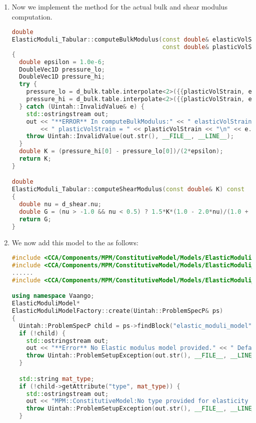 \begin{enumerate}
  \item Now we implement the method for the actual bulk and shear modulus computation.
\begin{lstlisting}[language=Cpp]
double
ElasticModuli_Tabular::computeBulkModulus(const double& elasticVolStrain,
                                          const double& plasticVolStrain) const
{
  double epsilon = 1.0e-6;
  DoubleVec1D pressure_lo;
  DoubleVec1D pressure_hi;
  try {
    pressure_lo = d_bulk.table.interpolate<2>({{plasticVolStrain, elasticVolStrain-epsilon}});
    pressure_hi = d_bulk.table.interpolate<2>({{plasticVolStrain, elasticVolStrain+epsilon}});
  } catch (Uintah::InvalidValue& e) {
    std::ostringstream out;
    out << "**ERROR** In computeBulkModulus:" << " elasticVolStrain = " << elasticVolStrain
        << " plasticVolStrain = " << plasticVolStrain << "\n" << e.message();
    throw Uintah::InvalidValue(out.str(), __FILE__, __LINE__);
  }
  double K = (pressure_hi[0] - pressure_lo[0])/(2*epsilon);
  return K;
}

double
ElasticModuli_Tabular::computeShearModulus(const double& K) const
{
  double nu = d_shear.nu;
  double G = (nu > -1.0 && nu < 0.5) ? 1.5*K*(1.0 - 2.0*nu)/(1.0 + nu) : d_shear.G0;
  return G;
}
\end{lstlisting}

  \item We now add this model to the  as follows:
\begin{lstlisting}[language=Cpp]
#include <CCA/Components/MPM/ConstitutiveModel/Models/ElasticModuliModelFactory.h>
#include <CCA/Components/MPM/ConstitutiveModel/Models/ElasticModuli_Arena.h>
......
#include <CCA/Components/MPM/ConstitutiveModel/Models/ElasticModuli_Tabular.h>

using namespace Vaango;
ElasticModuliModel*
ElasticModuliModelFactory::create(Uintah::ProblemSpecP& ps)
{
  Uintah::ProblemSpecP child = ps->findBlock("elastic_moduli_model");
  if (!child) {
    std::ostringstream out;
    out << "**Error** No Elastic modulus model provided." << " Default (constant elasticity) model needs at least two input parameters." << std::endl;
    throw Uintah::ProblemSetupException(out.str(), __FILE__, __LINE__);
  }

  std::string mat_type;
  if (!child->getAttribute("type", mat_type)) {
    std::ostringstream out;
    out << "MPM::ConstitutiveModel:No type provided for elasticity model.";
    throw Uintah::ProblemSetupException(out.str(), __FILE__, __LINE__);
  }


\end{lstlisting}
\end{enumerate}

